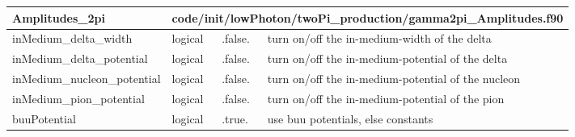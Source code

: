 \documentclass{article}
\begin{document}

\begin{longtable}{llll}
\toprule
\textbf{\large{Amplitudes\_2pi}} & \multicolumn{3}{l}{\footnotesize{code/init/lowPhoton/twoPi\_production/gamma2pi\_Amplitudes.f90}}\\*
\midrule
\endfirsthead
\midrule
\endhead
inMedium\_delta\_width & \begin{minipage}[t]{2cm}logical\end{minipage} & \begin{minipage}[t]{2cm}.false.\end{minipage} & \begin{minipage}[t]{12cm}turn on/off the in-medium-width of the delta\end{minipage}\\*
\midrule
inMedium\_delta\_potential & \begin{minipage}[t]{2cm}logical\end{minipage} & \begin{minipage}[t]{2cm}.false.\end{minipage} & \begin{minipage}[t]{12cm}turn on/off the in-medium-potential of the delta\end{minipage}\\*
\midrule
inMedium\_nucleon\_potential & \begin{minipage}[t]{2cm}logical\end{minipage} & \begin{minipage}[t]{2cm}.false.\end{minipage} & \begin{minipage}[t]{12cm}turn on/off the in-medium-potential of the nucleon\end{minipage}\\*
\midrule
inMedium\_pion\_potential & \begin{minipage}[t]{2cm}logical\end{minipage} & \begin{minipage}[t]{2cm}.false.\end{minipage} & \begin{minipage}[t]{12cm}turn on/off the in-medium-potential of the pion\end{minipage}\\*
\midrule
buuPotential & \begin{minipage}[t]{2cm}logical\end{minipage} & \begin{minipage}[t]{2cm}.true.\end{minipage} & \begin{minipage}[t]{12cm}use buu potentials, else constants\end{minipage}\\*
\bottomrule
\end{longtable}
{ }
\end{document}
